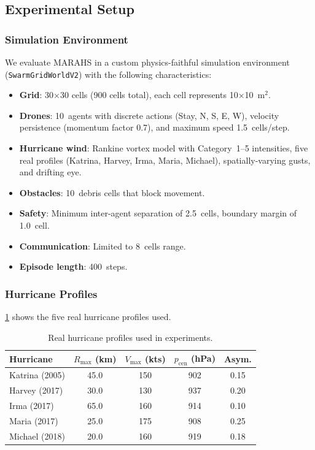 \documentclass[11pt,twocolumn]{article}
\providecommand{\Cref}[1]{\ref{#1}}
\theoremstyle{definition}
\begin{document}
\subsection{Experimental Setup}

\subsubsection{Simulation Environment}

We evaluate MARAHS in a custom physics-faithful simulation environment (\texttt{SwarmGridWorldV2}) with the following characteristics:

\begin{itemize}[leftmargin=*]
    \item \textbf{Grid}: 30$\times$30 cells (900 cells total), each cell represents 10$\times$10~m$^2$.
    \item \textbf{Drones}: 10~agents with discrete actions (Stay, N, S, E, W), velocity persistence (momentum factor 0.7), and maximum speed 1.5~cells/step.
    \item \textbf{Hurricane wind}: Rankine vortex model with Category~1--5 intensities, five real profiles (Katrina, Harvey, Irma, Maria, Michael), spatially-varying gusts, and drifting eye.
    \item \textbf{Obstacles}: 10~debris cells that block movement.
    \item \textbf{Safety}: Minimum inter-agent separation of 2.5~cells, boundary margin of 1.0~cell.
    \item \textbf{Communication}: Limited to 8~cells range.
    \item \textbf{Episode length}: 400~steps.
\end{itemize}

\subsubsection{Hurricane Profiles}

\Cref{tab:hurricane_profiles} shows the five real hurricane profiles used.

\begin{table}[t]
\centering
\caption{Real hurricane profiles used in experiments.}
\label{tab:hurricane_profiles}
\small
\begin{tabular}{lcccc}
\toprule
\textbf{Hurricane} & $R_{\max}$ (km) & $V_{\max}$ (kts) & $p_{\text{cen}}$ (hPa) & Asym. \\
\midrule
Katrina (2005) & 45.0 & 150 & 902 & 0.15 \\
Harvey (2017) & 30.0 & 130 & 937 & 0.20 \\
Irma (2017) & 65.0 & 160 & 914 & 0.10 \\
Maria (2017) & 25.0 & 175 & 908 & 0.25 \\
Michael (2018) & 20.0 & 160 & 919 & 0.18 \\
\bottomrule
\end{tabular}
\end{table}
\end{document}
